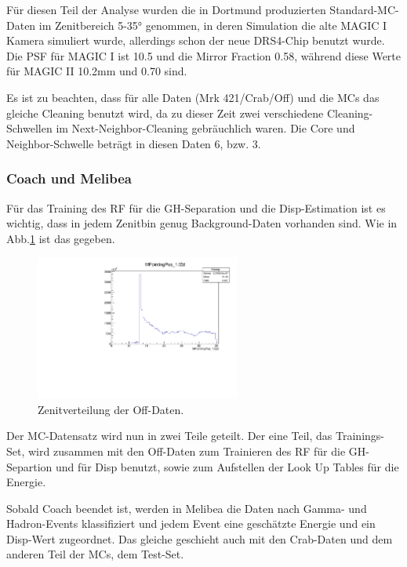 Für diesen Teil der Analyse wurden die in Dortmund produzierten Standard-MC-Daten im Zenitbereich 5-35° genommen, in deren Simulation die alte MAGIC I Kamera simuliert wurde, allerdings schon der neue DRS4-Chip benutzt wurde.
Die PSF für MAGIC I ist 10.5 und die Mirror Fraction 0.58, während diese Werte für MAGIC II 10.2mm und 0.70 sind.

Es ist zu beachten, dass für alle Daten (Mrk 421/Crab/Off) und die MCs das gleiche Cleaning benutzt wird, da zu dieser Zeit zwei verschiedene Cleaning-Schwellen im Next-Neighbor-Cleaning gebräuchlich waren.
Die Core und Neighbor-Schwelle beträgt in diesen Daten 6, bzw. 3.


\subsubsection{Coach und Melibea}
Für das Training des RF für die GH-Separation und die Disp-Estimation ist es wichtig, dass in jedem Zenitbin genug Background-Daten vorhanden sind.
Wie in Abb.\ref{Datenset2_Zenitverteilung_Off} ist das gegeben.

\begin{figure}
    \centering
    \includegraphics[width=0.6\textwidth]{./Plots/04_MrkAnalyse/Datenset2/Part2_2_Background_Zenith.pdf}
    \caption{Zenitverteilung der Off-Daten.}
    \label{Datenset2_Zenitverteilung_Off}
\end{figure}

Der MC-Datensatz wird nun in zwei Teile geteilt.
Der eine Teil, das Trainings-Set, wird zusammen mit den Off-Daten zum Trainieren des RF für die GH-Separtion und für Disp benutzt, sowie zum Aufstellen der Look Up Tables für die Energie.

Sobald Coach beendet ist, werden in Melibea die Daten nach Gamma- und Hadron-Events klassifiziert und jedem Event eine geschätzte Energie und ein Disp-Wert zugeordnet.
Das gleiche geschieht auch mit den Crab-Daten und dem anderen Teil der MCs, dem Test-Set.


